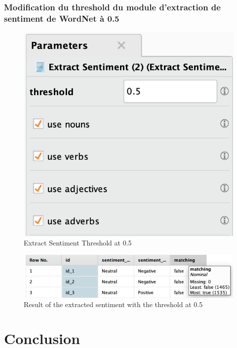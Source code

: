 \documentclass[a4paper]{article}
\begin{document}
\subsubsection{Modification du threshold du module d'extraction de sentiment de WordNet à 0.5}
\begin{figure}[H]
\begin{center}
	\caption{Extract Sentiment Threshold at 0.5}
	\label{fig:3_processing_documents_full_0_5}
	\includegraphics[width=\linewidth/3]{imgs/part_3/3_processing_documents_full_0_5}
\end{center}
\end{figure}
\begin{figure}[H]
\begin{center}
	\includegraphics[width=\linewidth]{imgs/part_3/3_processing_documents_full_0_5_results}
	\caption{Result of the extracted sentiment with the threshold at 0.5}
	\label{fig:3_processing_documents_full_0_5_results}
\end{center}
\end{figure}

\section{Conclusion}
\end{document}
